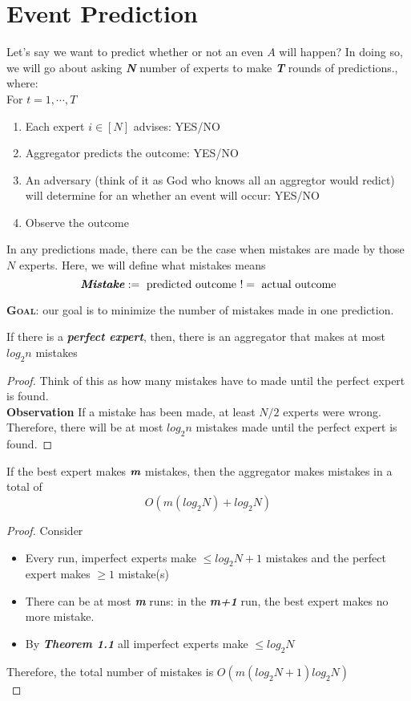\documentclass[12pt]{article}
\begin{document}
\MakeScribeTop
\section{Event Prediction}
Let's say we want to predict whether or not an even $A$ will happen? In doing so, we will go about asking \textit{\textbf{N}}  number of experts to make \textit{\textbf{T}}  rounds of predictions., where:\\

For $t= 1, \cdots, T$ \\
\begin{enumerate}
\item Each expert $i \in [N] $ advises: YES/NO
\item Aggregator predicts the outcome: YES/NO
\item An adversary (think of it as God who knows all an aggregtor would redict) will determine for an whether an event will occur: YES/NO
\item Observe the outcome 
\end{enumerate}
In any predictions made, there can be the case when mistakes are made by those $N$ experts. Here, we will define what mistakes means\\
$$\textbf{\textit{Mistake}} := \text{ predicted outcome } != \text{ actual outcome} $$

\textbf{\textsc{Goal}}: our goal is to minimize the number of mistakes made in one prediction.
\begin{theorem}
If there is a \textit{\textbf{perfect expert}}, then, there is an aggregator that makes at most $log_{2}n$ mistakes
\end{theorem}
\begin{proof}
Think of this as how many mistakes have to made until the perfect expert is found.\\
\textbf{Observation } If a mistake has been made, at least $N/2$ experts were wrong. Therefore, there will be at most  $log_{2}n$ mistakes made until the perfect expert is found.
\end{proof}
\begin{theorem}
If the best expert makes $\textit{\textbf{m}}$ mistakes, then the aggregator makes mistakes in a total of$$O(m(log_{2}N) + log_{2}N)$$ 
\end{theorem}
\clearpage
\begin{proof}
Consider
\begin{itemize}
\item Every run,  imperfect experts make  $\leq log_{2}N +1$ mistakes and the perfect expert makes $\geq 1$ mistake(s)
\item There can be at most  \textbf{\textit{m}} runs: in the \textbf{\textit{m+1}} run, the best expert makes no more mistake.
\item By \textit{\textbf{Theorem 1.1}} all imperfect experts make $\leq log_{2}N$
\end{itemize}
Therefore, the total number of mistakes is
$O(m(log_{2}N +1) log_{2}N) $\\
\end{proof}
\end{document}
